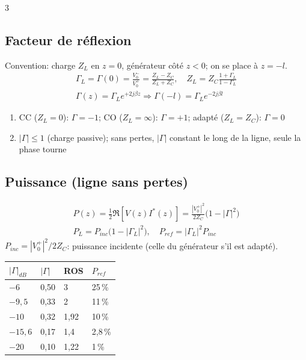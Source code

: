 \documentclass[12pt, a4paper]{article}
\begin{document}
\begin{multicols*}{3}
	\subsection{Facteur de réflexion}
	Convention: charge $Z_L$ en $z=0$, générateur côté $z<0$; on se place à $z=-l$.
	\begin{gather*}
		\Gamma_L=\Gamma(0)=\frac{V_0^-}{V_0^+}=\frac{Z_L-Z_C}{Z_L+Z_C},\quad Z_L=Z_C\frac{1+\Gamma_L}{1-\Gamma_L}\\
		\Gamma(z)=\Gamma_Le^{+2j\beta z}\Rightarrow\Gamma(-l)=\Gamma_Le^{-2j\beta l}
	\end{gather*}
	\begin{enumerate}[\roman*.]
		\item CC ($Z_L=0$): $\Gamma=-1$; CO ($Z_L=\infty$): $\Gamma=+1$; adapté ($Z_L=Z_C$): $\Gamma=0$
		\item $|\Gamma|\leq1$ (charge passive); sans pertes, $|\Gamma|$ constant le long de la ligne, seule la phase tourne
	\end{enumerate}

	\subsection{Puissance (ligne sans pertes)}
	\begin{gather*}
		P(z)=\tfrac12\Re[V(z)I^*(z)]=\frac{|V_0^+|^2}{2Z_C}\big(1-|\Gamma|^2\big)\\
		P_L=P_{inc}\big(1-|\Gamma_L|^2\big),\quad P_{ref}=|\Gamma_L|^2P_{inc}
	\end{gather*}
	$P_{inc}=|V_0^+|^2/2Z_C$: puissance incidente (celle du générateur s'il est adapté).

	\begin{tabular}{|l|l|l|l|}
		\hline
		$|\Gamma|_{dB}$ & $|\Gamma|$ & ROS  & $P_{ref}$ \\
		\hline
		$-6$          & 0,50       & 3    & 25\,\%     \\
		$-9{,}5$      & 0,33       & 2    & 11\,\%     \\
		$-10$         & 0,32       & 1,92 & 10\,\%     \\
		$-15{,}6$     & 0,17       & 1,4  & 2,8\,\%    \\
		$-20$         & 0,10       & 1,22 & 1\,\%      \\
		\hline
	\end{tabular}

	\colbreak

\end{multicols*}
\end{document}
